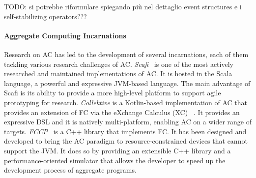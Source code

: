 \documentclass[12pt]{article}
\begin{document}
TODO: si potrebbe riformulare spiegando più nel dettaglio event structures e i self-stabilizing operators???

\paragraph{\textbf{Aggregate Computing Incarnations}} Research on AC has led to the development of several incarnations, each of them tackling various research challenges of AC.
\textit{Scafi}~\cite{casadei2016towards} is one of the most actively researched and maintained implementations of
AC. It is hosted in the Scala language, a powerful and expressive JVM-based language. The main advantage of Scafi is its ability to provide a
more high-level platform to support agile prototyping for research. \textit{Collektive} is a Kotlin-based implementation of AC that provides an extension of FC via the eXchange Calculus (XC) ~\cite{audrito2024exchange}.
It provides an expressive DSL and it is natively multi-platform, enabling AC on a wider range of targets.
\textit{FCCP}~\cite{audrito2024fcpp} is a C++ library that implements FC. It has been designed and developed to bring the AC paradigm to
resource-constrained devices that cannot support the JVM. It does so by providing an extensible C++ library and a performance-oriented simulator that allows
the developer to speed up the development process of aggregate programs.

 
\end{document}
